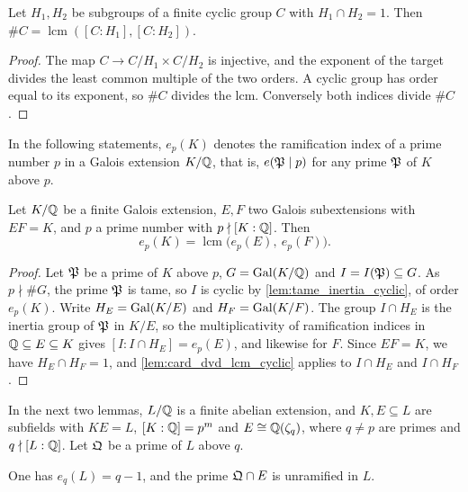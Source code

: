 \begin{lemma}
  \label{lem:card_dvd_lcm_cyclic}
  \leanok
  Let $H_1, H_2$ be subgroups of a finite cyclic group $C$ with $H_1 \cap H_2 = 1$. Then
  $\#C = \operatorname{lcm}([C : H_1], [C : H_2])$.
\end{lemma}

\begin{proof}
  \leanok
  The map $C \to C/H_1 \times C/H_2$ is injective, and the exponent of the target divides the
  least common multiple of the two orders. A cyclic group has order equal to its exponent, so
  $\#C$ divides the lcm. Conversely both indices divide $\#C$.
\end{proof}

In the following statements, $e_p(K)$ denotes the ramification index of a prime number $p$ in a
Galois extension $K/\mathbb{Q}$, that is, $e(\mathfrak{P} \mid p)$ for any prime $\mathfrak{P}$ of $K$ above $p$.

\begin{lemma}
  \label{lem:ramificationIdx_sup_dvd_lcm}
  \leanok
  Let $K/\mathbb{Q}$ be a finite Galois extension, $E, F$ two Galois subextensions with $EF = K$, and
  $p$ a prime number with $p \nmid [K:\mathbb{Q}]$. Then
  \[
    e_p(K) = \operatorname{lcm}\big(e_p(E),\ e_p(F)\big).
  \]
\end{lemma}

\begin{proof}
  \leanok
  Let $\mathfrak{P}$ be a prime of $K$ above $p$, $G = \mathrm{Gal}(K/\mathbb{Q})$ and $I = I(\mathfrak{P}) \subseteq G$. As
  $p \nmid \#G$, the prime $\mathfrak{P}$ is tame, so $I$ is cyclic by \ref{lem:tame_inertia_cyclic}, of
  order $e_p(K)$. Write $H_E = \mathrm{Gal}(K/E)$ and $H_F = \mathrm{Gal}(K/F)$. The group $I \cap H_E$ is the
  inertia group of $\mathfrak{P}$ in $K/E$, so the multiplicativity of ramification indices in
  $\mathbb{Q} \subseteq E \subseteq K$ gives $[I : I\cap H_E] = e_p(E)$, and likewise for $F$. Since
  $EF = K$, we have $H_E \cap H_F = 1$, and \ref{lem:card_dvd_lcm_cyclic} applies to $I \cap H_E$
  and $I \cap H_F$.
\end{proof}

In the next two lemmas, $L/\mathbb{Q}$ is a finite abelian extension, and $K, E \subseteq L$ are subfields
with $KE = L$, $[K:\mathbb{Q}] = p^m$ and $E \cong \mathbb{Q}(\zeta_q)$, where $q \neq p$ are primes and
$q \nmid [L:\mathbb{Q}]$. Let $\mathfrak{Q}$ be a prime of $L$ above $q$.

\begin{lemma}
  \label{lem:ramificationIdx_eq_of_sup_eq_top}
  \leanok
  One has $e_q(L) = q - 1$, and the prime $\mathfrak{Q} \cap E$ is unramified in $L$.
\end{lemma}

